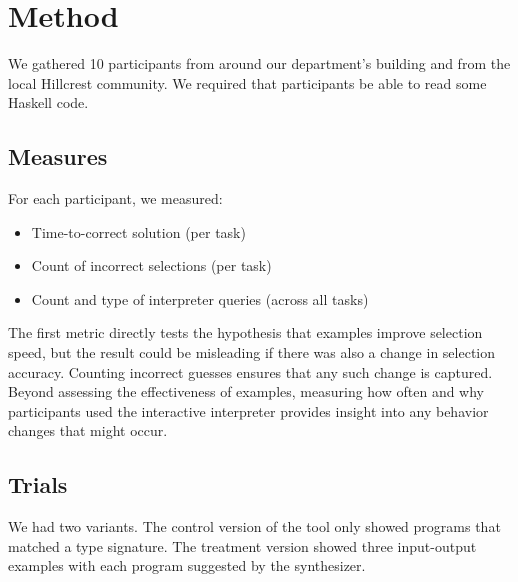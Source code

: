 \section{Method}





We gathered 10 participants from around our department's building and from the
local Hillcrest community.
%
We required that participants be able to read some Haskell code.

\subsection{Measures}

For each participant, we measured:
\begin{itemize}
    \item Time-to-correct solution (per task)
    \item Count of incorrect selections (per task)
    \item Count and type of interpreter queries (across all tasks)
\end{itemize}

The first metric directly tests the hypothesis that examples improve
selection speed, but the result could be misleading if there was also a
change in selection accuracy.
%
Counting incorrect guesses ensures that any such change is captured.
%
Beyond assessing the effectiveness of examples, measuring how often and why
participants used the interactive interpreter provides insight into any
behavior changes that might occur.

\subsection{Trials}
We had two variants.
%
The control version of the tool only showed programs that matched a type signature.
%
The treatment version showed three input-output examples with each program
suggested by the synthesizer.

